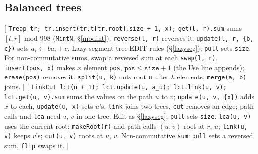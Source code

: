 \subsection{Balanced trees}
[
	 \texttt{Treap tr; tr.insert(tr.t[tr.root].size + 1, x);}
	 \texttt{get(l, r).sum} sums $[l, r]$ mod 998 (\texttt{MintN}, \S\ref{modint}). \texttt{reverse(l, r)} reverses it; \texttt{update(l, r, \{b, c\})} sets $a_i \gets b a_i + c$.
	 Lazy segment tree EDIT rules (\S\ref{lazyseg}); \texttt{pull} sets \texttt{size}. For non-commutative sums, swap a reversed sum at each \texttt{swap(l, r)}.
	 \texttt{insert(pos, x)} makes $x$ element \texttt{pos}, $\texttt{pos} \le \texttt{size} + 1$ (the Use line appends); \texttt{erase(pos)} removes it.
	 \texttt{split(u, k)} cuts root \texttt{u} after $k$ elements; \texttt{merge(a, b)} joins.
]\label{treap}
[
	 \texttt{LinkCut lct(n + 1); lct.update(u, a\_u); lct.link(u, v);}
	 \texttt{lct.get(u, v).sum} sums the values on the path $u$ to $v$; \texttt{update(u, v, \{x\})} adds $x$ to each, \texttt{update(u, x)} sets $u$'s.
	 \texttt{link} joins two trees, \texttt{cut} removes an edge; path calls and \texttt{lca} need $u$, $v$ in one tree. Edit as \S\ref{lazyseg}; \texttt{pull} sets \texttt{size}.
	 \texttt{lca(u, v)} uses the current root: \texttt{makeRoot(r)} and path calls $(u, v)$ root at $r$, $u$; \texttt{link(u, v)} keeps $v$'s; \texttt{cut(u, v)} roots at $u$, $v$.
	 Non-commutative \texttt{sum}: \texttt{pull} sets a reversed sum, \texttt{flip} swaps it.
]\label{linkcut}

